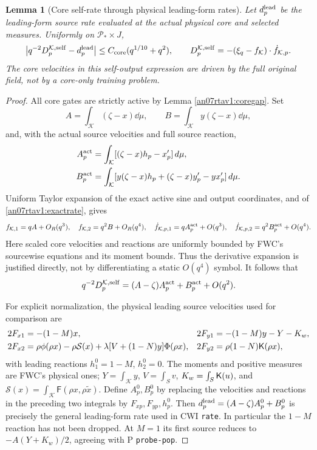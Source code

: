 \documentclass[11pt]{article}
\numberwithin{equation}{section}
\newtheorem{lemma}[theorem]{Lemma}
\newcommand{\KK}{\mathcal K}\newcommand{\BB}{\mathcal B}
\newcommand{\Ffun}{\mathsf F}
\begin{document}
\begin{lemma}[Core self-rate through physical leading-form rates]
\label{an07rtav1:corerate}
Let \(d_p^{\rm lead}\) be the leading-form source rate evaluated
at the actual physical core and selected measures. Uniformly on
\(\mathcal P_*\times J\),
\begin{equation}
 \left|q^{-2}D_p^{\KK,\rm self}-d_p^{\rm lead}\right|
 \le C_{\rm core}(q^{1/10}+q^2),\qquad
 D_p^{\KK,\rm self}=-(\xi_q-f_\KK)\cdot\dot f_{\KK,p}.
 \label{an07rtav1:coreprecision}
\end{equation}
The core velocities in this self-output expression are driven by
the full original field, not by a core-only training problem.
\end{lemma}
\begin{proof}
All core gates are strictly active by Lemma \ref{an07rtav1:coregap}.
Set
\[
 A=\int_\KK(\zeta-x)\dd\mu,\qquad
 B=\int_\KK y(\zeta-x)\dd\mu,
\]
and, with the actual source velocities and full source reaction,
\begin{align*}
 A_p^{\rm act}&=\int_\KK[(\zeta-x)h_p-x'_p]\dd\mu,\\
 B_p^{\rm act}&=\int_\KK[y(\zeta-x)h_p
                  +(\zeta-x)y'_p-yx'_p]\dd\mu.
\end{align*}
Uniform Taylor expansion of the exact active sine and output
coordinates, and of \eqref{an07rtav1:exactrate}, gives
\[
 f_{\KK,1}=qA+O_R(q^3),\quad f_{\KK,2}=q^2B+O_R(q^4),
 \quad \dot f_{\KK,p,1}=qA_p^{\rm act}+O(q^3),\quad
 \dot f_{\KK,p,2}=q^2B_p^{\rm act}+O(q^4).
\]
Here scaled core velocities and reactions are uniformly bounded
by FWC's sourcewise equations and its moment bounds. Thus the
derivative expansion is justified directly, not by differentiating
a static \(O(q^4)\) symbol. It follows that
\begin{equation}
 q^{-2}D_p^{\KK,\rm self}
       =(A-\zeta)A_p^{\rm act}+B_p^{\rm act}+O(q^2).
 \label{an07rtav1:corealgebra}
\end{equation}

For explicit normalization, the physical leading source velocities
used for comparison are
\begin{align*}
 2F_{x1}&=-(1-M)x,&2F_{y1}&=-(1-M)y-Y-K_w,\\
 2F_{x2}&=\rho\phi(\rho x)-\rho\mathcal S(x)
                  +\lambda[V+(1-N)y]\Phi(\rho x),&
 2F_{y2}&=\rho(1-N)\mathsf K(\rho x),
\end{align*}
with leading reactions \(h_1^0=1-M\), \(h_2^0=0\).
The moments and positive measures are FWC's physical ones;
\(Y=\int_\KK y\), \(V=\int_S v\),
\(K_w=\int_S\mathsf K(u)\), and
\(\mathcal S(x)=\int_\KK\Ffun(\rho x,\rho\widetilde x)\).
Define \(A_p^0,B_p^0\) by replacing the velocities and reactions
in the preceding two integrals by \(F_{xp},F_{yp},h_p^0\).
Then \(d_p^{\rm lead}=(A-\zeta)A_p^0+B_p^0\) is precisely
the general leading-form rate used in CWI \texttt{rate}.
In particular the \(1-M\) reaction has not been dropped.
At \(M=1\) its first source reduces to
\(-A(Y+K_w)/2\), agreeing with P \texttt{probe-pop}.


\end{proof}
\end{document}
